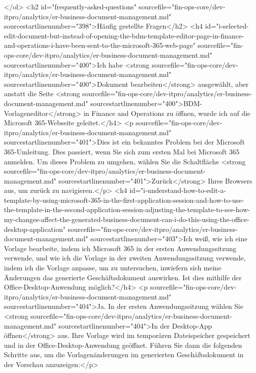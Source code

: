 </ol>
<h2 id="frequently-asked-questions" sourcefile="fin-ops-core/dev-itpro/analytics/er-business-document-management.md" sourcestartlinenumber="398">Häufig gestellte Fragen</h2>
<h4 id="i-selected-edit-document-but-instead-of-opening-the-bdm-template-editor-page-in-finance-and-operations-i-have-been-sent-to-the-microsoft-365-web-page" sourcefile="fin-ops-core/dev-itpro/analytics/er-business-document-management.md" sourcestartlinenumber="400">Ich habe <strong sourcefile="fin-ops-core/dev-itpro/analytics/er-business-document-management.md" sourcestartlinenumber="400">Dokument bearbeiten</strong> ausgewählt, aber anstatt die Seite <strong sourcefile="fin-ops-core/dev-itpro/analytics/er-business-document-management.md" sourcestartlinenumber="400">BDM-Vorlageneditor</strong> in Finance and Operations zu öffnen, wurde ich auf die Microsoft 365-Webseite geleitet.</h4>
<p sourcefile="fin-ops-core/dev-itpro/analytics/er-business-document-management.md" sourcestartlinenumber="401">Dies ist ein bekanntes Problem bei der Microsoft 365-Umleitung. Dies passiert, wenn Sie sich zum ersten Mal bei Microsoft 365 anmelden. Um dieses Problem zu umgehen, wählen Sie die Schaltfläche <strong sourcefile="fin-ops-core/dev-itpro/analytics/er-business-document-management.md" sourcestartlinenumber="401">Zurück</strong> Ihres Browsers aus, um zurück zu navigieren.</p>
<h4 id="i-understand-how-to-edit-a-template-by-using-microsoft-365-in-the-first-application-session-and-how-to-use-the-template-in-the-second-application-session-adjusting-the-template-to-see-how-my-changes-affect-the-generated-business-document-can-i-do-this-using-the-office-desktop-application" sourcefile="fin-ops-core/dev-itpro/analytics/er-business-document-management.md" sourcestartlinenumber="403">Ich weiß, wie ich eine Vorlage bearbeite, indem ich Microsoft 365 in der ersten Anwendungssitzung verwende, und wie ich die Vorlage in der zweiten Anwendungssitzung verwende, indem ich die Vorlage anpasse, um zu untersuchen, inwiefern sich meine Änderungen das generierte Geschäftsdokument auswirken. Ist dies mithilfe der Office-Desktop-Anwendung möglich?</h4>
<p sourcefile="fin-ops-core/dev-itpro/analytics/er-business-document-management.md" sourcestartlinenumber="404">Ja. In der ersten Anwendungssitzung wählen Sie <strong sourcefile="fin-ops-core/dev-itpro/analytics/er-business-document-management.md" sourcestartlinenumber="404">In der Desktop-App öffnen</strong> aus. Ihre Vorlage wird im temporären Dateispeicher gespeichert und in der Office-Desktop-Anwendung geöffnet. Führen Sie dann die folgenden Schritte aus, um die Vorlagenänderungen im generierten Geschäftsdokument in der Vorschau anzuzeigen:</p>
